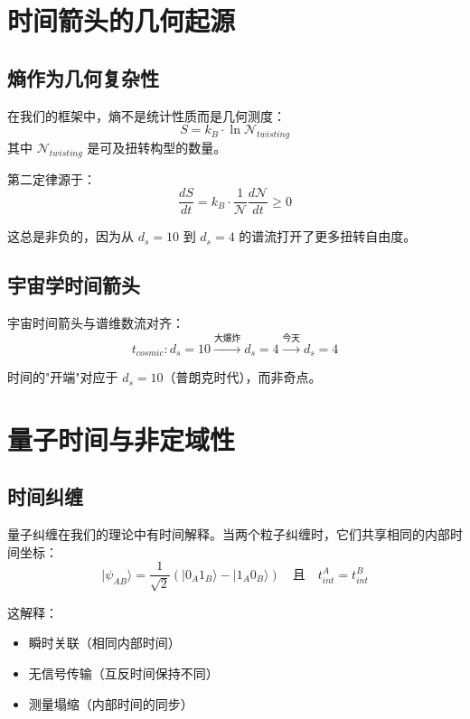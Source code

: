 \section{时间箭头的几何起源}

\subsection{熵作为几何复杂性}

在我们的框架中，熵不是统计性质而是几何测度：
\begin{equation}
    S = k_B \cdot \ln \mathcal{N}_{twisting}
\end{equation}
其中 $\mathcal{N}_{twisting}$ 是可及扭转构型的数量。

第二定律源于：
\begin{equation}
    \frac{dS}{dt} = k_B \cdot \frac{1}{\mathcal{N}}\frac{d\mathcal{N}}{dt} \geq 0
\end{equation}

这总是非负的，因为从 $d_s = 10$ 到 $d_s = 4$ 的谱流打开了更多扭转自由度。

\subsection{宇宙学时间箭头}

宇宙时间箭头与谱维数流对齐：
\begin{equation}
    t_{cosmic}: d_s = 10 \xrightarrow{\text{大爆炸}} d_s = 4 \xrightarrow{\text{今天}} d_s = 4
\end{equation}

时间的"开端"对应于 $d_s = 10$（普朗克时代），而非奇点。

\section{量子时间与非定域性}

\subsection{时间纠缠}

量子纠缠在我们的理论中有时间解释。当两个粒子纠缠时，它们共享相同的内部时间坐标：
\begin{equation}
    |\psi_{AB}\rangle = \frac{1}{\sqrt{2}}(|0_A 1_B\rangle - |1_A 0_B\rangle) \quad \text{且} \quad t_{int}^A = t_{int}^B
\end{equation}

这解释：
\begin{itemize}
    \item 瞬时关联（相同内部时间）
    \item 无信号传输（互反时间保持不同）
    \item 测量塌缩（内部时间的同步）
\end{itemize}

